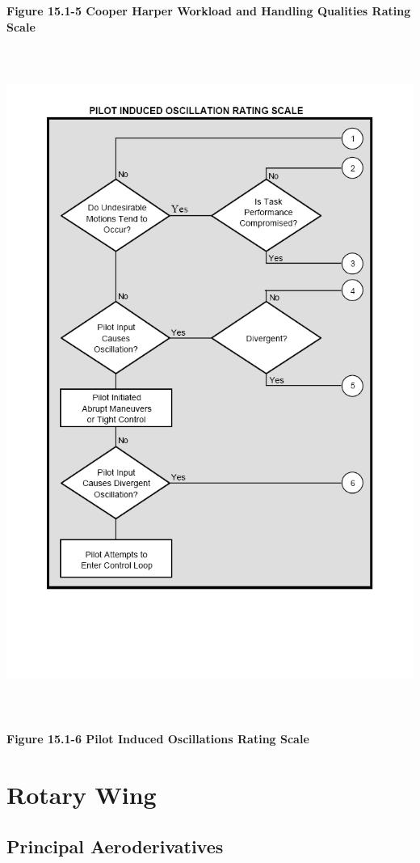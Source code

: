 \documentclass[
]{book}
\begin{document}
\textbf{Figure 15.1-5 Cooper Harper Workload and Handling Qualities Rating Scale}

\includegraphics[width=6.05833in,height=8.62986in]{media/15/image6.png}

\textbf{Figure 15.1-6 Pilot Induced Oscillations Rating Scale}

\hypertarget{rotary-wing}{%
\chapter{Rotary Wing}\label{rotary-wing}}

\hypertarget{principal-aeroderivatives}{%
\section{Principal Aeroderivatives}\label{principal-aeroderivatives}}
\end{document}
